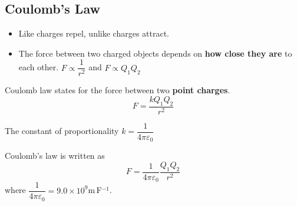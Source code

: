 \subsection{Coulomb's Law}

\begin{itemize}
    \item Like charges repel, unlike charges attract.
    \item The force between two charged objects depends on \textbf{how close they are} to each other.
        $F\propto\dfrac{1}{r^2}$ and $F\propto Q_1Q_2$
\end{itemize}

Coulomb law states for the force between two \textbf{point charges}.
$$F=\frac{kQ_1Q_2}{r^2}$$

The constant of proportionality $k=\dfrac{1}{4\pi\varepsilon_0}$

Coulomb's law is written as
$$F=\frac{1}{4\pi\varepsilon_0}\frac{Q_1Q_2}{r^2}$$
where $\dfrac{1}{4\pi\varepsilon_0}=9.0\times10^9$m\,F$^{-1}$.
